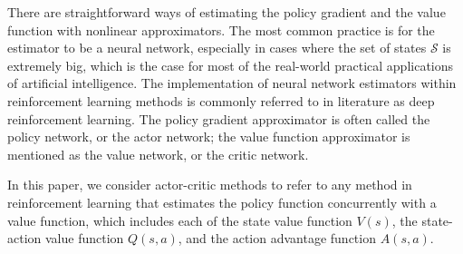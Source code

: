 There are straightforward ways of estimating the policy gradient and the value function with nonlinear approximators. The most common practice is for the estimator to be a neural network, especially in cases where the set of states $\mathcal{S}$ is extremely big, which is the case for most of the real-world practical applications of artificial intelligence. The implementation of neural network estimators within reinforcement learning methods is commonly referred to in literature as deep reinforcement learning. The policy gradient approximator is often called the policy network, or the actor network; the value function approximator is mentioned as the value network, or the critic network.

In this paper, we consider actor-critic methods to refer to any method in reinforcement learning that estimates the policy function concurrently with a value function, which includes each of the state value function $V(s)$, the state-action value function $Q(s,a)$, and the action advantage function $A(s,a)$.
